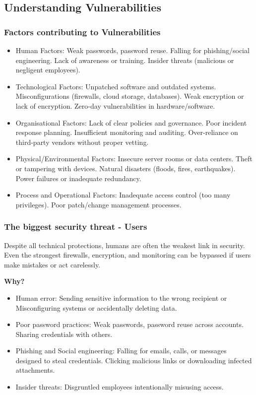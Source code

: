\subsection{Understanding Vulnerabilities}

\subsubsection{Factors contributing to Vulnerabilities}

\indent 

\begin{itemize}
    \item Human Factors: Weak passwords, password reuse. Falling for phishing/social engineering. Lack of awareness or training. Insider threats (malicious or negligent employees).
    \item Technological Factors: Unpatched software and outdated systems. Misconfigurations (firewalls, cloud storage, databases). Weak encryption or lack of encryption. Zero-day vulnerabilities in hardware/software.
    \item Organisational Factors: Lack of clear policies and governance. Poor incident response planning. Insufficient monitoring and auditing. Over-reliance on third-party vendors without proper vetting.
    \item Physical/Environmental Factors: Insecure server rooms or data centers. Theft or tampering with devices. Natural disasters (floods, fires, earthquakes). Power failures or inadequate redundancy.
    \item Process and Operational Factors: Inadequate access control (too many privileges). Poor patch/change management processes.
\end{itemize}

\subsubsection{The biggest security threat - Users}

\indent

Despite all technical protections, humans are often the weakest link in security. Even the strongest firewalls, encryption, and monitoring can be bypassed if users make mistakes or act carelessly.

\noindent\textbf{Why?}

\begin{itemize}
    \item Human error: Sending sensitive information to the wrong recipient or Misconfiguring systems or accidentally deleting data.
    \item Poor password practices: Weak passwords, password reuse across accounts. Sharing credentials with others.
    \item Phishing and Social engineering: Falling for emails, calls, or messages designed to steal credentials. Clicking malicious links or downloading infected attachments.
    \item Insider threats: Disgruntled employees intentionally misusing access.
\end{itemize}

